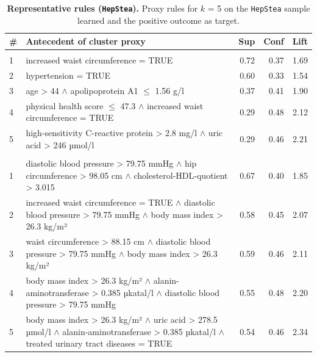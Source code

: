 \documentclass[
  oneside]{book}
\begin{document}
\begin{table}

\caption{\label{tab:04-findings-hep-stea}\textbf{Representative rules (\texttt{HepStea}).} Proxy rules for \(k\) = 5 on the \texttt{HepStea} sample learned and the positive outcome as target.}
\centering
\begin{tabular}[t]{l>{\raggedright\arraybackslash}p{10cm}rrr}
\toprule
\textbf{\#} & \textbf{Antecedent of cluster proxy} & \textbf{Sup} & \textbf{Conf} & \textbf{Lift}\\
\midrule
\addlinespace[0.3em]
\multicolumn{5}{l}{\textbf{HotSpot}}\\
\hspace{1em}1 & increased waist circumference = TRUE & 0.72 & 0.37 & 1.69\\
\hspace{1em}2 & hypertension = TRUE & 0.60 & 0.33 & 1.54\\
\hspace{1em}3 & age > 44 $\wedge$ apolipoprotein A1 $\leq$ 1.56 g/l & 0.37 & 0.41 & 1.90\\
\hspace{1em}4 & physical health score $\leq$ 47.3 $\wedge$ increased waist circumference = TRUE & 0.29 & 0.48 & 2.12\\
\hspace{1em}5 & high-sensitivity C-reactive protein > 2.8 mg/l $\wedge$ uric acid > 246 µmol/l & 0.29 & 0.46 & 2.21\\
\addlinespace[0.3em]
\multicolumn{5}{l}{\textbf{SD-Map}}\\
\hspace{1em}1 & diastolic blood pressure > 79.75 mmHg $\wedge$ hip circumference > 98.05 cm $\wedge$ cholesterol-HDL-quotient > 3.015 & 0.67 & 0.40 & 1.85\\
\hspace{1em}2 & increased waist circumference = TRUE $\wedge$ diastolic blood pressure > 79.75 mmHg $\wedge$ body mass index > 26.3 kg/m² & 0.58 & 0.45 & 2.07\\
\hspace{1em}3 & waist circumference > 88.15 cm $\wedge$ diastolic blood pressure > 79.75 mmHg $\wedge$ body mass index > 26.3 kg/m² & 0.59 & 0.46 & 2.11\\
\hspace{1em}4 & body mass index > 26.3 kg/m² $\wedge$ alanin-aminotransferase > 0.385 µkatal/l $\wedge$ diastolic blood pressure > 79.75 mmHg & 0.55 & 0.48 & 2.20\\
\hspace{1em}5 & body mass index > 26.3 kg/m² $\wedge$ uric acid > 278.5 µmol/l $\wedge$ alanin-aminotransferase > 0.385 µkatal/l $\wedge$ treated urinary tract diseases = TRUE & 0.54 & 0.46 & 2.34\\
\bottomrule
\end{tabular}
\end{table}
\end{document}
